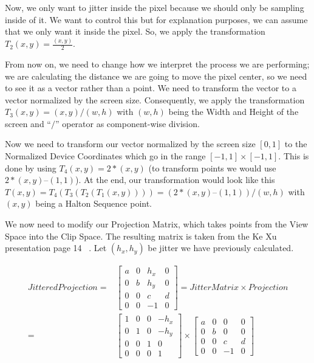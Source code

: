 \documentclass[pregrado]{tesis-usb} %
\begin{document}
Now, we only want to jitter inside the pixel because we should only be sampling inside of it. We want to control this but for explanation purposes, we can assume that we only want it inside the pixel. So, we apply the transformation $T_2(x, y) = \frac{(x, y)}{2}$.

From now on, we need to change how we interpret the process we are performing; we are calculating the distance we are going to move the pixel center, so we need to see it as a vector rather than a point. We need to transform the vector to a vector normalized by the screen size. Consequently, we apply the transformation $T_3(x, y) = (x, y) / (w, h)$ with $(w, h)$ being the Width and Height of the screen and “$/$” operator as component-wise division.

Now we need to transform our vector normalized by the screen size $[0, 1]$ to the Normalized Device Coordinates which go in the range $[-1, 1]\times [-1, 1]$. This is done by using $T_4(x, y) = 2 * (x, y)$ (to transform points we would use $2*(x, y) – (1, 1)$).
At the end, our transformation would look like this $T(x, y) = T_4(T_3(T_2(T_1(x, y)))) = (2 * (x, y) – (1, 1)) / (w, h)$ with $(x, y)$ being a Halton Sequence point.

We now need to modify our Projection Matrix, which takes points from the View Space into the Clip Space. The resulting matrix is taken from the Ke Xu presentation page 14 ~\cite{XU2016}. Let $(h_x,h_y)$ be jitter we have previously calculated.

\begin{equation}
\begin{split}
JitteredProjection = & \begin{bmatrix*} 
a & 0 & h_x & 0 \\ 
0 & b & h_y & 0 \\
0 & 0 & c & d   \\
0 & 0 & -1 & 0   \end{bmatrix*} = JitterMatrix\times Projection \\
= & \begin{bmatrix*} 
1 & 0 & 0 & -h_x \\ 
0 & 1 & 0 & -h_y \\
0 & 0 & 1 & 0   \\
0 & 0 & 0 & 1   \end{bmatrix*} \times \begin{bmatrix*} 
a & 0 & 0 & 0 \\ 
0 & b & 0 & 0 \\
0 & 0 & c & d   \\
0 & 0 & -1 & 0   \end{bmatrix*}
\end{split}
\end{equation}
\end{document}
